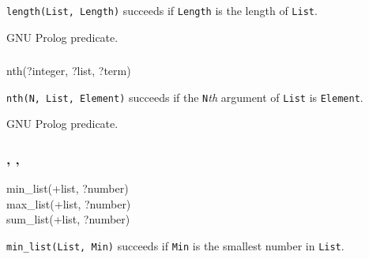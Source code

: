 \Description

\texttt{length(List, Length)} succeeds if \texttt{Length} is the length of
\texttt{List}.

\begin{PlErrors}




\end{PlErrors}

GNU Prolog predicate.

\subsubsection{}

\begin{TemplatesOneCol}
nth(?integer, ?list, ?term)

\end{TemplatesOneCol}

\Description

\texttt{nth(N, List, Element)} succeeds if the \texttt{N}\emph{th}
argument of \texttt{List} is \texttt{Element}.

\PlErrorsNone

\Portability

GNU Prolog predicate.

\subsubsection{,
               ,
               }

\begin{TemplatesOneCol}
min\_list(+list, ?number)\\
max\_list(+list, ?number)\\
sum\_list(+list, ?number)

\end{TemplatesOneCol}

\Description

\texttt{min\_list(List, Min)} succeeds if \texttt{Min} is the
smallest number in \texttt{List}.

